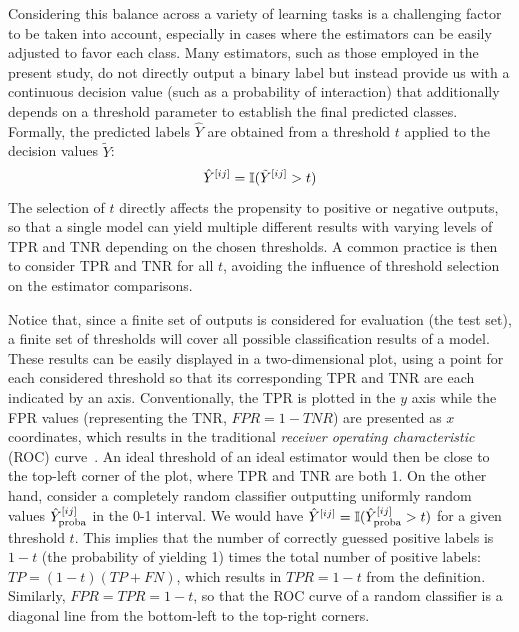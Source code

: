 Considering this balance across a variety of learning tasks
is a challenging factor to be taken into account, especially in cases where the estimators can be easily adjusted to favor each class.
%
Many estimators, such as those employed in the present study, do not directly output a binary label but instead provide us with a continuous decision value (such as a probability of interaction) that additionally depends on a threshold parameter to establish the final predicted classes. Formally, the predicted labels $\hat Y$ are obtained from a threshold $t$ applied to the decision values $\tilde Y$:
%
\begin{equation}
    \hat Y^{[ij]} = \mathbb{I}(\tilde Y^{[ij]} > t)
\end{equation}
%
The selection of $t$ directly affects the propensity to positive or negative outputs, so that a single model can yield multiple different results with varying levels of TPR and TNR depending on the chosen thresholds.
A common practice is then to consider TPR and TNR for all $t$, avoiding the influence of threshold selection on the estimator comparisons.

Notice that, since a finite set of outputs is considered for evaluation (the test set), a finite set of thresholds will cover all possible classification results of a model. These results can be easily displayed in a two-dimensional plot, using a point for each considered threshold so that its corresponding TPR and TNR are each indicated by an axis. Conventionally, the TPR is plotted in the $y$ axis while the FPR values (representing the TNR, $FPR=1-TNR$) are presented as $x$ coordinates, which results in the traditional \emph{receiver operating characteristic} (ROC) curve~\cite{davis2006relationship,hand2009measuring,he2009learning,ezzat2019computational}. %
%
An ideal threshold of an ideal estimator would then be close to the top-left corner of the plot, where TPR and TNR are both 1.
On the other hand, consider a completely random classifier outputting uniformly random values $\hat Y_\text{proba}^{[ij]}$ in the 0-1 interval. We would have $\hat Y^{[ij]} = \mathbb{I}(\hat Y_\text{proba}^{[ij]} > t)$ for a given threshold $t$. This implies that the number of correctly guessed positive labels is $1-t$ (the probability of yielding 1) times the total number of positive labels: $TP = (1-t) (TP+FN)$, which results in $TPR = 1-t$ from the definition. Similarly, $FPR = TPR = 1-t$, so that the ROC curve of a random classifier is a diagonal line from the bottom-left to the top-right corners.

